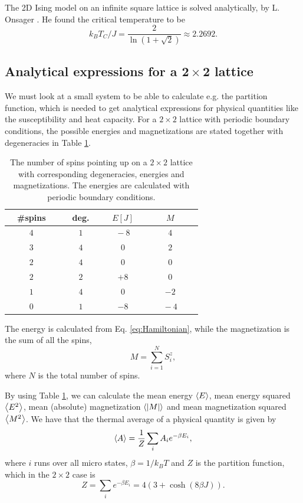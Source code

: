 \documentclass[%
 reprint,
nofootinbib,
aps,
]{revtex4-1}
\begin{document}
The 2D Ising model on an infinite square lattice is solved analytically, by L. Onsager \cite{onsager}. He found the critical temperature to be
\begin{equation}
k_B T_C / J = \frac{2}{\ln (1 + \sqrt{2})} \approx 2.2692.
\end{equation}



\subsection{Analytical expressions for a $\boldsymbol{2 \times 2}$ lattice}

We must look at a small system to be able to calculate e.g. the  partition function, which is needed to get analytical expressions for physical quantities like the susceptibility and heat capacity. For a $2 \times 2$ lattice with periodic boundary conditions, the possible energies and magnetizations are stated together with degeneracies in Table \ref{table:2times2}. 

\begin{table}[]
\caption{The number of spins pointing up on a $2\times 2$ lattice with corresponding degeneracies, energies and magnetizations. The energies are calculated with periodic boundary conditions.}
\label{table:2times2}
\begin{tabular}{@{}cccc@{}}
\toprule
$\quad$\#spins$\quad$ & deg. & $E [J]$   & $M$  \\ \midrule
$4$     & $\qquad 1\qquad$  & $\quad-8\quad$ & $4$  \\
$3$     & $4$  & $0$   & $2$  \\
$2$     & $4$  & $0$   & $0$  \\
$2$     & $2$  & $+8$ & $0$  \\
$1$     & $4$  & $0$   & $-2$ \\
$0$     & $1$  & $-8$ & $\qquad -4\qquad$ \\ \bottomrule
\end{tabular}
\end{table}

The energy is calculated from Eq. \eqref{eq:Hamiltonian}, while the magnetization is the sum of all the spins,
\begin{equation}
M = \sum_{i = 1}^{N} S^z_i,
\end{equation}
where $N$ is the total number of spins.

By using Table \ref{table:2times2}, we can calculate the mean energy $\ev{E}$, mean energy squared $\ev{E^2}$, mean (absolute) magnetization $\ev{\abs{M}}$ and mean magnetization squared $\ev{M^2}$. We have that the thermal average of a physical quantity is given by
\begin{equation}
\ev{A} = \frac{1}{Z} \sum_i A_i e^{-\beta E_i},
\end{equation}
where $i$ runs over all micro states, $\beta = 1/k_B T$ and $Z$ is the partition function, which in the $2 \times 2$ case is
\begin{equation}
Z = \sum_i e^{-\beta E_i} = 4\left(3 + \cosh (8\beta J)\right).
\end{equation}
\end{document}
